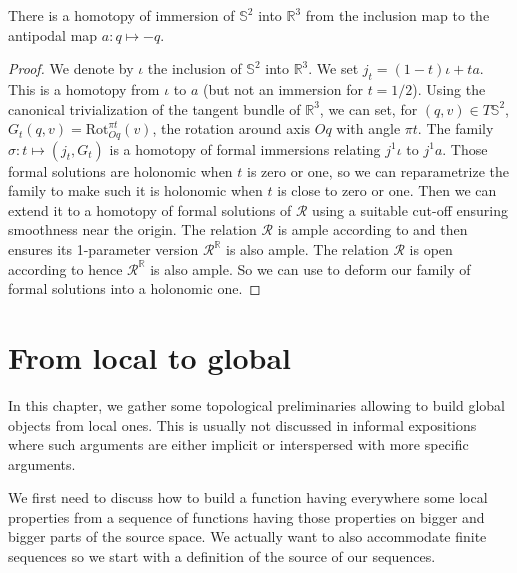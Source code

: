 \documentclass[10pt,a4paper]{article}
\newcounter{chapter}
\newcommand{\co}{\!:}
\newcommand{\Rel}{\mathcal{R}} %
\newcommand{\uses}[1]{}
\newcommand{\lean}[1]{}
\newcommand{\leanok}{}
\begin{document}
\begin{theorem}[Smale 1958]
  \lean{sphere_eversion_of_loc}
  \label{sphere_eversion_of_loc}
  \leanok
  There is a homotopy of immersion of $𝕊^2$ into $ℝ^3$ from the inclusion map to
	the antipodal map $a \co q ↦ -q$.
\end{theorem}

\begin{proof}
  \leanok
  \uses{lem:loc_immersion_rel_open, lem:loc_immersion_rel_ample, lem:h_principle_open_ample_loc, lem:param_trick}
	We denote by $ι$ the inclusion of $𝕊^2$ into $ℝ^3$.
	We set $j_t = (1-t)ι	+ ta$.
  This is a homotopy from $ι$ to $a$ (but not an immersion for $t=1/2$).
  Using the canonical trivialization of the tangent
	bundle of $ℝ^3$, we can set, for $(q, v) ∈ T𝕊^2$,
	$G_t(q, v) = \mathrm{Rot}_{Oq}^{πt}(v)$, the rotation around axis $Oq$ with
	angle $πt$.
  The family $σ : t ↦ (j_t, G_t)$ is a homotopy of formal immersions
  relating $j^1ι$ to $j^1a$. Those formal solutions are holonomic when $t$ is
  zero or one, so we can reparametrize the family to make such it is holonomic
  when $t$ is close to zero or one. Then we can extend it to a homotopy of
  formal solutions of $\Rel$ using a suitable cut-off ensuring smoothness
  near the origin. The relation $\Rel$ is ample according to
   and then  ensures
  its 1-parameter version $\Rel^ℝ$ is also ample. The relation $\Rel$ is open according to
   hence $\Rel^ℝ$ is also ample.
  So we can use  to deform our family of
  formal solutions into a holonomic one.
\end{proof}


\chapter{From local to global}%
\label{cha:from_local_to_global}

In this chapter, we gather some topological preliminaries allowing to build
global objects from local ones. This is usually not discussed in informal expositions
where such arguments are either implicit or interspersed with more specific arguments.

We first need to discuss how to build a function having everywhere some local
properties from a sequence of functions having those properties on bigger and
bigger parts of the source space. We actually want to also accommodate finite sequences
so we start with a definition of the source of our sequences.
\end{document}
